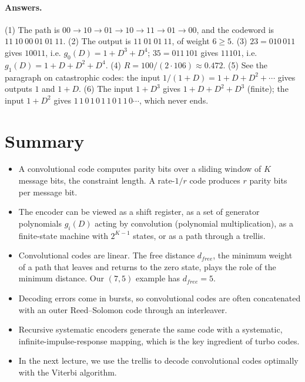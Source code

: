 \paragraph{Answers.}
(1) The path is \(00 \to 10 \to 01 \to 10 \to 11 \to 01 \to 00\), and the codeword is \(11\ 10\ 00\ 01\ 01\ 11\).
(2) The output is \(11\ 01\ 01\ 11\), of weight \(6 \geq 5\).
(3) \(23 = 010\,011\) gives \(10011\), i.e. \(g_0(D) = 1 + D^3 + D^4\); \(35 = 011\,101\) gives \(11101\), i.e. \(g_1(D) = 1 + D + D^2 + D^4\).
(4) \(R = 100/(2 \cdot 106) \approx 0.472\).
(5) See the paragraph on catastrophic codes: the input \(1/(1+D) = 1 + D + D^2 + \cdots\) gives outputs \(1\) and \(1 + D\).
(6) The input \(1 + D^3\) gives \(1 + D + D^2 + D^3\) (finite); the input \(1 + D^2\) gives \(1\,1\,0\,1\,0\,1\,1\,0\,1\,1\,0 \cdots\), which never ends.

\section{Summary}
\begin{itemize}
    \item A convolutional code computes parity bits over a sliding window of \(K\) message bits, the constraint length. A rate-\(1/r\) code produces \(r\) parity bits per message bit.
    \item The encoder can be viewed as a shift register, as a set of generator polynomials \(g_i(D)\) acting by convolution (polynomial multiplication), as a finite-state machine with \(2^{K-1}\) states, or as a path through a trellis.
    \item Convolutional codes are linear. The free distance \(d_{free}\), the minimum weight of a path that leaves and returns to the zero state, plays the role of the minimum distance. Our \((7,5)\) example has \(d_{free} = 5\).
    \item Decoding errors come in bursts, so convolutional codes are often concatenated with an outer Reed--Solomon code through an interleaver.
    \item Recursive systematic encoders generate the same code with a systematic, infinite-impulse-response mapping, which is the key ingredient of turbo codes.
    \item In the next lecture, we use the trellis to decode convolutional codes optimally with the Viterbi algorithm.
\end{itemize}
